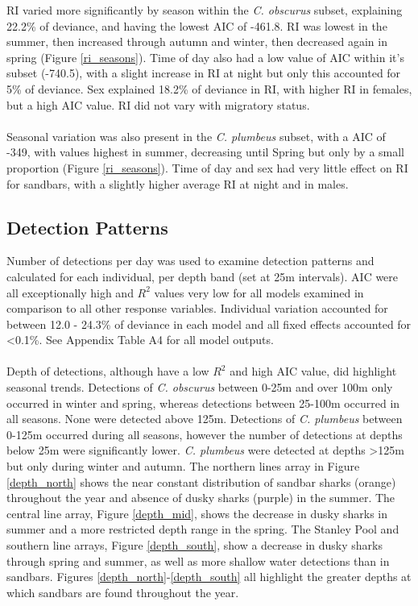 \documentclass[11pt,a4paper]{article}
\begin{document}
	\noindent RI varied more significantly by season within the \textit{C. obscurus} subset, explaining 22.2\% of deviance, and having the lowest AIC of -461.8. RI was lowest in the summer, then increased through autumn and winter, then decreased again in spring (Figure \ref{ri_seasons}). Time of day also had a low value of AIC within it's subset (-740.5), with a slight increase in RI at night but only this accounted for 5\% of deviance. Sex explained 18.2\% of deviance in RI, with higher RI in females, but a high AIC value. RI did not vary with migratory status. \\
	\\
	Seasonal variation was also present in the \textit{C. plumbeus} subset, with a AIC of -349, with values highest in summer, decreasing until Spring but only by a small proportion (Figure \ref{ri_seasons}). Time of day and sex had very little effect on RI for sandbars, with a slightly higher average RI at night and in males.
	
	

	\subsection{Detection Patterns}
	
	Number of detections per day was used to examine detection patterns and calculated for each individual, per depth band (set at 25m intervals). AIC were all exceptionally high and $R^2$ values very low for all models examined in comparison to all other response variables. Individual variation accounted for between 12.0 - 24.3\% of deviance in each model and all fixed effects accounted for \textless0.1\%. See Appendix Table A4 for all model outputs.\\
	\\
	Depth of detections, although have a low $R^2$ and high AIC value, did highlight seasonal trends. Detections of \textit{C. obscurus} between 0-25m and over 100m only occurred in winter and spring, whereas detections between 25-100m occurred in all seasons. None were detected above 125m. Detections of \textit{C. plumbeus} between 0-125m occurred during all seasons, however the number of detections at depths below 25m were significantly lower. \textit{C. plumbeus} were detected at depths \textgreater125m but only during winter and autumn. The northern lines array in Figure \ref{depth_north} shows the near constant distribution of sandbar sharks (orange) throughout the year and absence of dusky sharks (purple) in the summer. The central line array, Figure \ref{depth_mid}, shows the decrease in dusky sharks in summer and a more restricted depth range in the spring. The Stanley Pool and southern line arrays, Figure \ref{depth_south}, show a decrease in dusky sharks through spring and summer, as well as more shallow water detections than in sandbars. Figures \ref{depth_north}-\ref{depth_south} all highlight the greater depths at which sandbars are found throughout the year.
	
\end{document}
